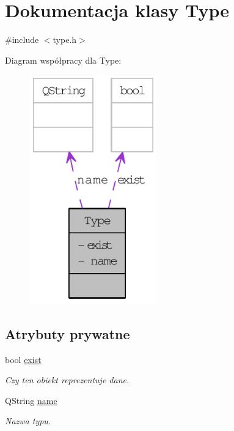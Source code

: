 \hypertarget{classType}{
\section{Dokumentacja klasy Type}
\label{classType}
}


{\ttfamily \#include $<$type.h$>$}



Diagram współpracy dla Type:\nopagebreak
\begin{figure}[H]
\begin{center}
\leavevmode
\includegraphics[width=156pt]{classType__coll__graph}
\end{center}
\end{figure}
\subsection*{Atrybuty prywatne}
\begin{DoxyCompactItemize}
\item 
bool \hyperlink{classType_a443615a82c231e8d640b1b44e53d64b4}{exist}
\begin{DoxyCompactList}\small\item\em Czy ten obiekt reprezentuje dane. \item\end{DoxyCompactList}\item 
QString \hyperlink{classType_a6e24434e904a6dfd418c73f160460bac}{name}
\begin{DoxyCompactList}\small\item\em Nazwa typu. \item\end{DoxyCompactList}\end{DoxyCompactItemize}


